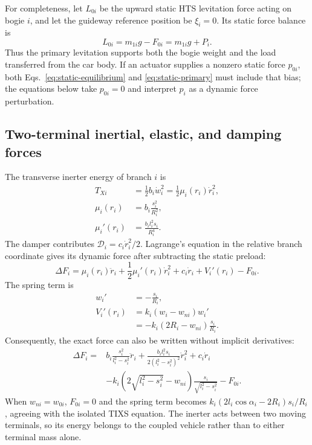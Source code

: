 \documentclass[a4paper,12pt]{article}
\numberwithin{equation}{section}
\begin{document}
For completeness, let $L_{0i}$ be the upward static HTS levitation force acting on bogie $i$, and let the guideway reference position be $\xi_i=0$. Its static force balance is
\begin{equation}
L_{0i}=m_{1i}g-F_{0i}=m_{1i}g+P_i.
\label{eq:static-primary}
\end{equation}
Thus the primary levitation supports both the bogie weight and the load transferred from the car body. If an actuator supplies a nonzero static force $p_{0i}$, both Eqs.~\eqref{eq:static-equilibrium} and \eqref{eq:static-primary} must include that bias; the equations below take $p_{0i}=0$ and interpret $p_i$ as a dynamic force perturbation.

\subsection{Two-terminal inertial, elastic, and damping forces}
The transverse inerter energy of branch $i$ is
\begin{equation}
\begin{aligned}
T_{Xi}
 &=\frac12b_i\dot w_i^2
 =\frac12\mu_i(r_i)\dot r_i^2,\\
\mu_i(r_i)
 &=b_i\frac{s_i^2}{R_i^2},\\
\mu_i'(r_i)
 &=\frac{b_il_i^2s_i}{R_i^4}.
\end{aligned}
\label{eq:two-terminal-inertia}
\end{equation}
The damper contributes $\mathcal D_i=c_i\dot r_i^2/2$. Lagrange's equation in the relative branch coordinate gives its dynamic force after subtracting the static preload:
\begin{equation}
 \boxed{\Delta F_i
 =\mu_i(r_i)\ddot r_i
 +\frac12\mu_i'(r_i)\dot r_i^2
 +c_i\dot r_i+V_i'(r_i)-F_{0i}.}
 \label{eq:branch-force}
\end{equation}
The spring term is
\begin{equation}
\begin{aligned}
w_i'&=-\frac{s_i}{R_i},\\
V_i'(r_i)
 &=k_i(w_i-w_{ni})w_i'\\
 &=-k_i(2R_i-w_{ni})\frac{s_i}{R_i}.
\end{aligned}
\label{eq:branch-spring}
\end{equation}
Consequently, the exact force can also be written without implicit derivatives:
\begin{equation}
 \boxed{\begin{aligned}
 \Delta F_i={}&b_i\frac{s_i^2}{l_i^2-s_i^2}\ddot r_i
 +\frac{b_il_i^2s_i}{2(l_i^2-s_i^2)^2}\dot r_i^2
 +c_i\dot r_i\\
 &-k_i\left(2\sqrt{l_i^2-s_i^2}-w_{ni}\right)
 \frac{s_i}{\sqrt{l_i^2-s_i^2}}-F_{0i}.
 \end{aligned}}
 \label{eq:branch-force-explicit}
\end{equation}
When $w_{ni}=w_{0i}$, $F_{0i}=0$ and the spring term becomes $k_i(2l_i\cos\alpha_i-2R_i)s_i/R_i$, agreeing with the isolated TIXS equation. The inerter acts between two moving terminals, so its energy belongs to the coupled vehicle rather than to either terminal mass alone.
\end{document}
